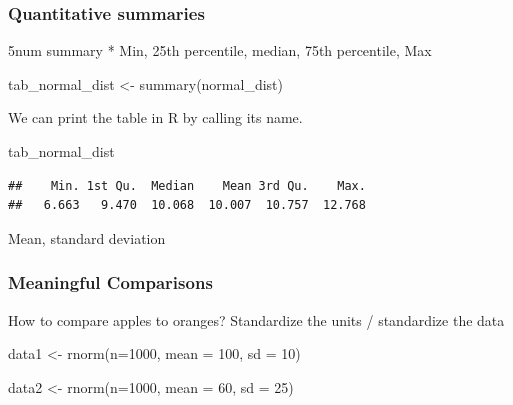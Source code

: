 \documentclass[
]{book}
\newenvironment{Shaded}{\begin{snugshade}}{\end{snugshade}}
\newcommand{\AttributeTok}[1]{\textcolor[rgb]{0.77,0.63,0.00}{#1}}
\newcommand{\DecValTok}[1]{\textcolor[rgb]{0.00,0.00,0.81}{#1}}
\newcommand{\FunctionTok}[1]{\textcolor[rgb]{0.00,0.00,0.00}{#1}}
\newcommand{\NormalTok}[1]{#1}
\newcommand{\OtherTok}[1]{\textcolor[rgb]{0.56,0.35,0.01}{#1}}
\begin{document}
\hypertarget{quantitative-summaries}{%
\subsubsection{Quantitative summaries}\label{quantitative-summaries}}

5num summary
* Min, 25th percentile, median, 75th percentile, Max

\begin{Shaded}
\begin{Highlighting}[]
\NormalTok{tab\_normal\_dist }\OtherTok{\textless{}{-}} \FunctionTok{summary}\NormalTok{(normal\_dist)}
\end{Highlighting}
\end{Shaded}

We can print the table in R by calling its name.

\begin{Shaded}
\begin{Highlighting}[]
\NormalTok{tab\_normal\_dist}
\end{Highlighting}
\end{Shaded}

\begin{verbatim}
##    Min. 1st Qu.  Median    Mean 3rd Qu.    Max. 
##   6.663   9.470  10.068  10.007  10.757  12.768
\end{verbatim}

Mean, standard deviation

\hypertarget{meaningful-comparisons}{%
\subsubsection{Meaningful Comparisons}\label{meaningful-comparisons}}

How to compare apples to oranges? Standardize the units / standardize the data

\begin{Shaded}
\begin{Highlighting}[]
\NormalTok{data1 }\OtherTok{\textless{}{-}} \FunctionTok{rnorm}\NormalTok{(}\AttributeTok{n=}\DecValTok{1000}\NormalTok{, }
              \AttributeTok{mean =} \DecValTok{100}\NormalTok{,}
              \AttributeTok{sd =} \DecValTok{10}\NormalTok{)}

\NormalTok{data2 }\OtherTok{\textless{}{-}} \FunctionTok{rnorm}\NormalTok{(}\AttributeTok{n=}\DecValTok{1000}\NormalTok{,}
               \AttributeTok{mean =} \DecValTok{60}\NormalTok{, }
               \AttributeTok{sd =} \DecValTok{25}\NormalTok{)}
\end{Highlighting}
\end{Shaded}
\end{document}

